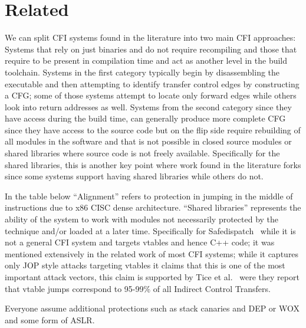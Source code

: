 \section{Related}
\label{sec:related}

We can split CFI systems found in the literature into two main CFI approaches: 
Systems that rely on just binaries and do not require recompiling 
and those that require to be present in compilation time and act as 
another level in the build toolchain. 
Systems in the first category typically begin by disassembling the 
executable and then attempting to identify transfer control edges 
by constructing a CFG; some of those systems attempt to locate only 
forward edges while others look into return addresses as well. Systems 
from the second category since they have access during the build time, 
can generally produce more complete CFG since they have access to 
the source code but on the flip side require rebuilding of all modules 
in the software and that is not possible in closed source modules or shared 
libraries where source code is not freely available. Specifically for the shared 
libraries, this is another key point where work found in the literature forks 
since some systems support having shared libraries while others do not.



In the table below ``Alignment'' refers to protection in jumping in the middle 
of instructions due to x86 CISC dense architecture. ``Shared libraries'' represents 
the ability of the system to work with modules not necessarily protected by 
the technique and/or loaded at a later time. 
Specifically for Safedispatch~\cite{jang2014safedispatch} while it is not a  general CFI system
and targets vtables and hence C++ code; it was mentioned 
extensively in the related work of most CFI systems; while it captures only JOP style 
attacks targeting vtables it claims that this is one of the most important attack vectors, 
this claim is supported by Tice et al.~\cite{tice2014enforcing} were they report that 
vtable jumps correspond to 95-99\% of all Indirect Control Transfers. 

Everyone assume additional protections such as stack canaries and DEP or WOX 
and some form of ASLR.



